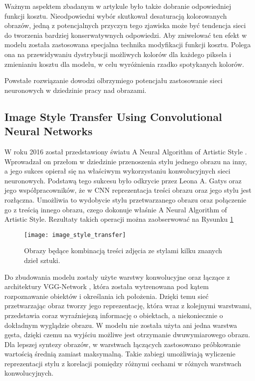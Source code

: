     Ważnym aspektem zbadanym w artykule było także dobranie odpowiedniej
    funkcji kosztu. Nieodpowiedni wybór skutkował desaturacją kolorowanych
    obrazów, jedną z potencjalnych przyczyn tego zjawiska może być tendencja
    sieci do tworzenia bardziej konserwatywnych odpowiedzi. Aby zniwelować ten
    efekt w modelu została zastosowana specjalna technika modyfikacji
    funkcji kosztu. Polega ona na przewidywaniu dystrybucji możliwych kolorów
    dla każdego piksela i zmienianiu kosztu dla modelu, w celu wyróżnienia rzadko
    spotykanych kolorów.

    Powstałe rozwiązanie dowodzi olbrzymiego potencjału zastosowanie sieci
    neuronowych w dziedzinie pracy nad obrazami.

  \subsection{Image Style Transfer Using Convolutional Neural Networks}
    W roku 2016 został przedstawiony światu A Neural Algorithm of Artistic Style
    \cite{image_style_transfer}. Wprowadzał on przełom w dziedzinie przenoszenia
    stylu jednego obrazu na inny, a jego sukces opierał się na właściwym wykorzystaniu
    konwolucyjnych sieci neuronowych. Podstawą tego sukcesu było odkrycie przez
    Leona A. Gatys oraz jego współpracowników, że w CNN reprezentacja treści
    obrazu oraz jego stylu jest rozłączna. Umożliwia to wydobycie stylu
    przetwarzanego obrazu oraz połączenie go z treścią innego obrazu, czego
    dokonuje właśnie A Neural Algorithm of Artistic Style. Rezultaty takich
    operacji można zaobserwować na Rysunku \ref{fig:image_style_transfer}

    \begin{figure}[ht]
      \centering
      \texttt{[image: image\_style\_transfer]}
      \caption{Obrazy będące kombinacją treści zdjęcia ze stylami kilku znanych dzieł sztuki.}
      \label{fig:image_style_transfer}
    \end{figure}

    Do zbudowania modelu zostały użyte warstwy konwolucyjne oraz łączące z
    architektury VGG-Network \cite{vgg_network}, która została wytrenowana pod
    kątem rozpoznawanie obiektów i określania ich położenia. Dzięki temu sieć
    przetwarzając obraz tworzy jego reprezentację, która wraz z
    kolejnymi warstwami, przedstawia coraz wyraźniejszą informację o obiektach,
    a niekoniecznie o dokładnym wyglądzie obrazu.
    W modelu nie została użyta ani jedna warstwa gęsta, dzięki czemu na wyjściu
    możliwe jest otrzymanie dwuwymiarowego obrazu.
    Dla lepszej syntezy obrazów, w warstwach
    łączących zastosowano próbkowanie wartością średnią zamiast maksymalną.
    Takie zabiegi umożliwiają wyliczenie reprezentacji stylu z korelacji
    pomiędzy różnymi cechami w różnych warstwach konwolucyjnych.

